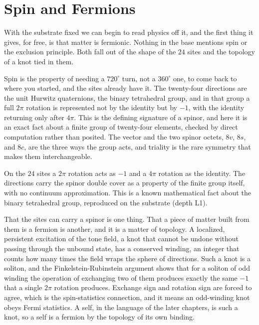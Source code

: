 \section{Spin and Fermions}

With the substrate fixed we can begin to read physics off it, and the first thing it gives, for free, is that matter is fermionic. Nothing in the base mentions spin or the exclusion principle. Both fall out of the shape of the $24$ sites and the topology of a knot tied in them.

Spin is the property of needing a $720^\circ$ turn, not a $360^\circ$ one, to come back to where you started, and the sites already have it. The twenty-four directions are the unit Hurwitz quaternions, the binary tetrahedral group, and in that group a full $2\pi$ rotation is represented not by the identity but by $-1$, with the identity returning only after $4\pi$. This is the defining signature of a spinor, and here it is an exact fact about a finite group of twenty-four elements, checked by direct computation rather than posited. The vector and the two spinor octets, $8v$, $8s$, and $8c$, are the three ways the group acts, and triality is the rare symmetry that makes them interchangeable.

\begin{result}
On the $24$ sites a $2\pi$ rotation acts as $-1$ and a $4\pi$ rotation as the identity. The directions carry the spinor double cover as a property of the finite group itself, with no continuum approximation. This is a known mathematical fact about the binary tetrahedral group, reproduced on the substrate (depth L1).
\end{result}

That the sites can carry a spinor is one thing. That a piece of matter built from them is a fermion is another, and it is a matter of topology. A localized, persistent excitation of the tone field, a knot that cannot be undone without passing through the unbound state, has a conserved winding, an integer that counts how many times the field wraps the sphere of directions. Such a knot is a soliton, and the Finkelstein-Rubinstein argument shows that for a soliton of odd winding the operation of exchanging two of them produces exactly the same $-1$ that a single $2\pi$ rotation produces. Exchange sign and rotation sign are forced to agree, which is the spin-statistics connection, and it means an odd-winding knot obeys Fermi statistics. A self, in the language of the later chapters, is such a knot, so a self is a fermion by the topology of its own binding.

